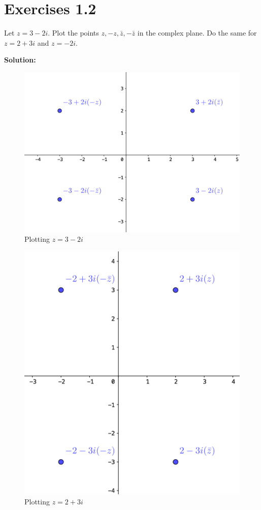 \documentclass[12pt]{article}
\makeatletter
\theoremstyle{homework}
\newenvironment{exercise}[1]
{\def\@currentlabel{#1}\exercisecore}
{\endexercisecore}
\newcommand{\localhead}[1]{\par\smallskip\noindent\textbf{#1}\nobreak\\}%
\newcommand\solution{\localhead{Solution:}}
\makeatother
\begin{document}
\section*{Exercises 1.2}
\begin{exercise}{4} Let $z = 3 - 2i$. Plot the points $z, -z, \bar z,-\bar z$ in the complex plane. Do the same for 
    $z = 2 + 3i$ and $z = -2i$. \\
    \solution 
    \begin{figure}[H]
        \begin{center}
        \caption{Plotting $z = 3 - 2i$}
        \includegraphics[width= .60 \textwidth]{plot1.png}
        \end{center}
    \end{figure}
    \begin{figure}[H]
        \begin{center}
        \caption{Plotting $z = 2 + 3i$}
        \includegraphics[width= .60 \textwidth]{plot2.png}
        \end{center}
    \end{figure}
    \begin{figure}[H]

\end{figure}
\end{exercise}
\end{document}
